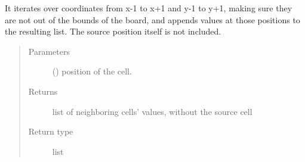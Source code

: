 \documentclass[letterpaper,10pt,english]{sphinxmanual}
\begin{document}
\begin{fulllineitems}
\begin{fulllineitems}
It iterates over coordinates from x-1 to x+1 and y-1 to y+1, making
sure they are not out of the bounds of the board, and appends values
at those positions to the resulting list. The source position itself
is not included.
\begin{quote}\begin{description}
\item[{Parameters}] \leavevmode
{} ({\hyperref[\detokenize{util:util.Vec}]{}}) \textendash{} position of the cell.

\item[{Returns}] \leavevmode
list of neighboring cells’ values, without the source cell

\item[{Return type}] \leavevmode
list

\end{description}\end{quote}

\end{fulllineitems}


\end{fulllineitems}

\end{document}
